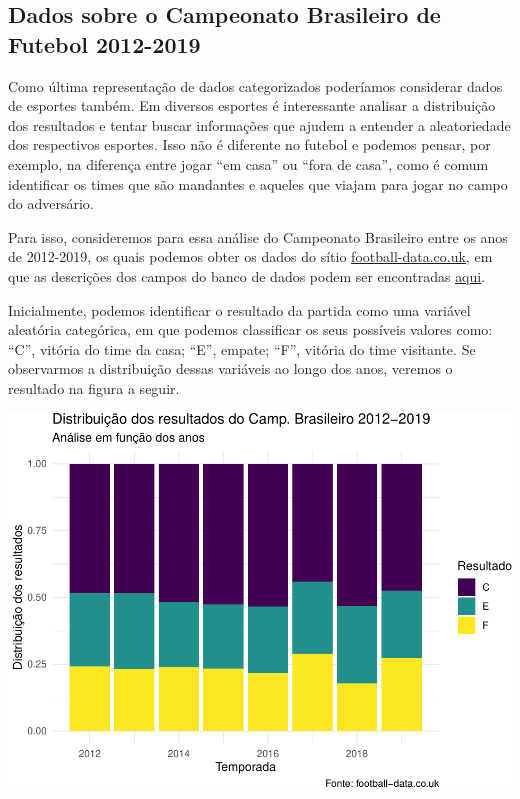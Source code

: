 \documentclass[]{book}
\begin{document}
\hypertarget{dados-sobre-o-campeonato-brasileiro-de-futebol-2012-2019}{%
\subsection{Dados sobre o Campeonato Brasileiro de Futebol 2012-2019}\label{dados-sobre-o-campeonato-brasileiro-de-futebol-2012-2019}}

Como última representação de dados categorizados poderíamos considerar dados de esportes também. Em diversos esportes é interessante analisar a distribuição dos resultados e tentar buscar informações que ajudem a entender a aleatoriedade dos respectivos esportes. Isso não é diferente no futebol e podemos pensar, por exemplo, na diferença entre jogar ``em casa'' ou ``fora de casa'', como é comum identificar os times que são mandantes e aqueles que viajam para jogar no campo do adversário.

Para isso, consideremos para essa análise do Campeonato Brasileiro entre os anos de 2012-2019, os quais podemos obter os dados do sítio \href{https://www.football-data.co.uk/brazil.php}{football-data.co.uk}, em que as descrições dos campos do banco de dados podem ser encontradas \href{http://www.football-data.co.uk/notes.txt}{aqui}.

Inicialmente, podemos identificar o resultado da partida como uma variável aleatória categórica, em que podemos classificar os seus possíveis valores como: ``C'', vitória do time da casa; ``E'', empate; ``F'', vitória do time visitante. Se observarmos a distribuição dessas variáveis ao longo dos anos, veremos o resultado na figura a seguir.

\begin{center}\includegraphics[width=0.8\linewidth]{notas_livro_files/figure-latex/graf8-1} \end{center}
\end{document}
